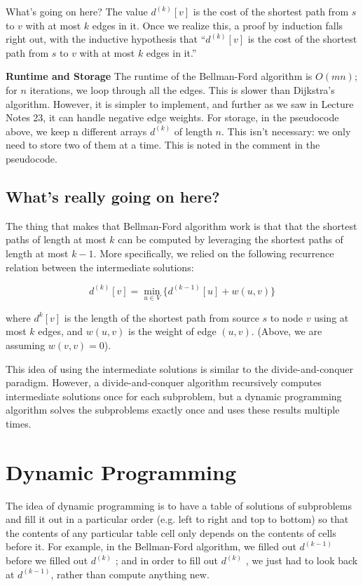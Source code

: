 \documentclass [12pt]{article}
\theoremstyle{definition}
\begin{document}
What's going on here? The value $d^{(k)}[v]$ is the cost of the shortest path from $s$ to $v$ with at most $k$ edges in it. Once we realize this, a proof by induction falls right out, with the inductive hypothesis that ``$d^{(k)}[v]$ is the cost of the shortest path from $s$ to $v$ with at most $k$ edges in it.''

\textbf{Runtime and Storage} The runtime of the Bellman-Ford algorithm is $O(mn)$; for $n$ iterations, we loop through all the edges. This is slower than Dijkstra's algorithm. However, it is simpler to implement, and further as we saw in Lecture Notes 23, it can handle negative edge weights. For storage, in the pseudocode above, we keep n different arrays $d^{(k)}$ of length $n$. This isn't necessary: we only need to store two of them at a time. This is noted in the
comment in the pseudocode.

\subsection{What's really going on here?}
 
The thing that makes that Bellman-Ford algorithm work is that that the shortest paths of length at most $k$ can be computed by leveraging the shortest paths of length at most $k - 1$. More specifically, we relied on the following recurrence relation between the intermediate solutions: 

$$
d^{(k)} [v ] = \min_{u \in V}\{ d^{(k-1)}[u] + w(u, v ) \}
$$

where $d^{k}[v ]$ is the length of the shortest path from source $s$ to node $v$ using at most $k$ edges, and $w(u, v )$ is the weight of edge $(u, v )$. (Above, we are assuming $w(v, v ) = 0$).

This idea of using the intermediate solutions is similar to the divide-and-conquer paradigm. However, a divide-and-conquer algorithm recursively computes intermediate solutions once for each subproblem, but a dynamic programming algorithm solves the subproblems exactly once and uses these results multiple times.

\section{Dynamic Programming} 

The idea of dynamic programming is to have a table of solutions of subproblems and fill it out in a particular order (e.g. left to right and top to bottom) so that the contents of any particular table cell only depends on the contents of cells before it. For example, in the Bellman-Ford algorithm, we filled out $d^{(k-1)}$ before we filled out $d^{(k)}$ ; and in order to fill out $d^{(k)}$ , we just had to look back at $d^{(k-1)}$, rather than compute anything new.
\end{document}
